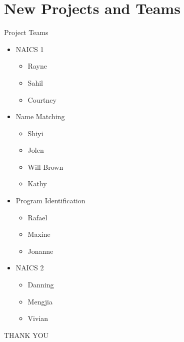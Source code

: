 \documentclass{beamer}
\begin{document}
\section{New Projects and Teams}

\begin{frame}{Project Teams}
  \begin{itemize}
      \item{NAICS 1
      \begin{itemize}
          \item{Rayne}
          \item{Sahil}
          \item{Courtney}
      \end{itemize}
      }
      \item{Name Matching
      \begin{itemize}
          \item{Shiyi}
          \item{Jolen}
          \item{Will Brown}
          \item{Kathy}
      \end{itemize}
      }
      \item{Program Identification
      \begin{itemize}
         \item{Rafael}
         \item{Maxine}
         \item{Jonanne}
      \end{itemize}
      }
      \item{NAICS 2
      \begin{itemize}
          \item{Danning}
          \item{Mengjia}
          \item{Vivian}
      \end{itemize}
      }
  \end{itemize}
\end{frame}


\begin{frame}
  THANK YOU
\end{frame}
\end{document}
